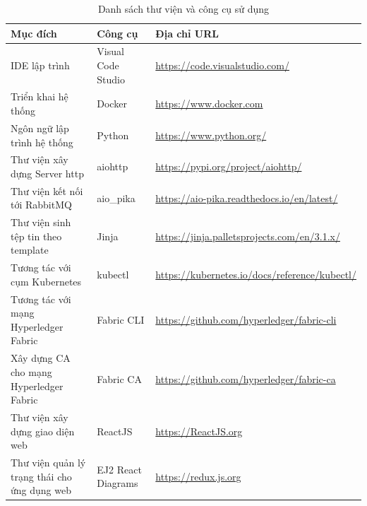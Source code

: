 \documentclass[../DoAn.tex]{subfiles}
\begin{document}
\begin{longtable}{|p{}|p{}|p{}|}
    \caption{Danh sách thư viện và công cụ sử dụng}
    \label{tab:toolsAndLib}                                                                                                                  \\
    \hline
    \textbf{Mục đích}                                & \textbf{Công cụ}       & \textbf{Địa chỉ URL}                                         \\ \hline
    \endhead
    IDE lập trình                                    & Visual Code Studio     & \url{https://code.visualstudio.com/}                         \\ \hline
    Triển khai hệ thống                              & Docker                 & \url{https://www.docker.com}                                 \\ \hline
    Ngôn ngữ lập trình hệ thống                      & Python                 & \url{https://www.python.org/}                                \\ \hline
    Thư viện xây dựng Server http                    & aiohttp                & \url{https://pypi.org/project/aiohttp/}                      \\ \hline
    Thư viện kết nối tới RabbitMQ                    & aio\_pika              & \url{https://aio-pika.readthedocs.io/en/latest/}             \\ \hline
    Thư viện sinh tệp tin theo template              & Jinja                  & \url{https://jinja.palletsprojects.com/en/3.1.x/}            \\ \hline
    Tương tác với cụm Kubernetes                     & kubectl                & \url{https://kubernetes.io/docs/reference/kubectl/}          \\ \hline
    Tương tác với mạng Hyperledger Fabric            & Fabric CLI             & \url{https://github.com/hyperledger/fabric-cli}              \\ \hline
    Xây dựng CA cho mạng Hyperledger Fabric          & Fabric CA              & \url{https://github.com/hyperledger/fabric-ca}               \\ \hline
    Thư viện xây dựng giao diện web                  & ReactJS                & \url{https://ReactJS.org}                                    \\ \hline
    Thư viện quản lý trạng thái cho ứng dụng web     & EJ2 React Diagrams     & \url{https://redux.js.org}                                   \\ \hline

\end{longtable}
\end{document}
